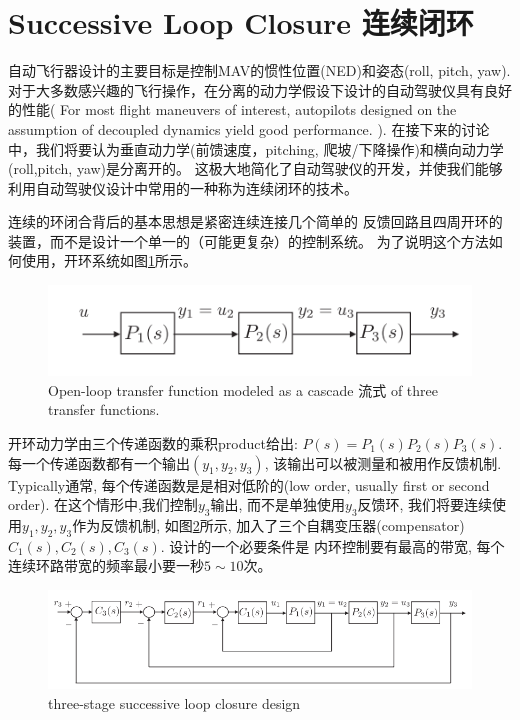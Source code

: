 \documentclass[UTF8,a4paper,10pt,nocolorlinks]{ctexart}
\begin{document}
    \section{Successive Loop Closure 连续闭环}
    自动飞行器设计的主要目标是控制MAV的惯性位置(NED)和姿态(roll, pitch, yaw).
    对于大多数感兴趣的飞行操作，在分离的动力学假设下设计的自动驾驶仪具有良好的性能( For most flight maneuvers of interest, autopilots designed on the assumption of decoupled dynamics yield good performance. ).
    在接下来的讨论中，我们将要认为垂直动力学(前馈速度，pitching, 爬坡/下降操作)和横向动力学(roll,pitch, yaw)是分离开的。
    这极大地简化了自动驾驶仪的开发，并使我们能够利用自动驾驶仪设计中常用的一种称为连续闭环的技术。
    \par 
    连续的环闭合背后的基本思想是紧密连续连接几个简单的
    反馈回路且四周开环的装置，而不是设计一个单一的（可能更复杂）的控制系统。
    为了说明这个方法如何使用，开环系统如图\ref{fig:6:1}所示。
    \begin{figure}[H]
        \centering %
        \includegraphics[width=\textwidth]{pictures/6_1.png} 
        \caption{Open-loop transfer
        function modeled as a cascade 流式 of
        three transfer functions.}
        \label{fig:6:1}
    \end{figure}
    \par 开环动力学由三个传递函数的乘积product给出: $P(s) = P_{1}(s)P_{2}(s)P_{3}(s)$.
    每一个传递函数都有一个输出$(y_{1}, y_{2}, y_{3})$, 该输出可以被测量和被用作反馈机制. Typically通常, 每个传递函数是是相对低阶的(low order, usually first or second order).
    在这个情形中,我们控制$y_{3}$输出, 而不是单独使用$y_{3}$反馈环, 我们将要连续使用$y_{1}, y_{2}, y_{3}$作为反馈机制, 如图\ref{fig:6:2}所示, 加入了三个自耦变压器(compensator) $C_{1}(s), C_{2}(s), C_{3}(s)$. 设计的一个必要条件是 内环控制要有最高的带宽, 每个连续环路带宽的频率最小要一秒$5 \sim 10$次。\par
    \begin{figure}[H]
        \centering %
        \includegraphics[width=\textwidth]{pictures/6_2.png} 
        \caption{three-stage successive loop closure design}
        \label{fig:6:2}
    \end{figure}
\end{document}
